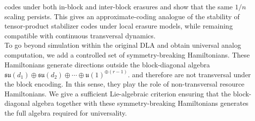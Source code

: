 \documentclass[10pt,twocolumn,superscriptaddress,aps,amsmath,amssymb,citeautoscript,floatfix,prx,longbibliography]{revtex4-2}
\newcounter{alg}
\theoremstyle{plain}
\theoremstyle{plain}
\theoremstyle{plain}
\theoremstyle{plain}
\theoremstyle{plain}
\theoremstyle{plain}
\begin{document}
{codes under both in-block and inter-block erasures and show that the same \(1/n\) scaling persists. This gives an approximate-coding analogue of the stability of tensor-product stabilizer codes under local erasure models, while remaining compatible with continuous transversal dynamics.\\
To go beyond simulation within the original DLA and obtain universal analog computation, we add a controlled set of symmetry-breaking Hamiltonians. These Hamiltonians generate directions outside the block-diagonal algebra
$
    \mathfrak{su}(d_1)\oplus\mathfrak{su}(d_2)\oplus\cdots
    \oplus \mathfrak{u}(1)^{\oplus(r-1)}.
$
and therefore are not transversal under the block encoding. In this sense, they play the role of non-transversal resource Hamiltonians. We give a sufficient Lie-algebraic criterion ensuring that the block-diagonal algebra together with these symmetry-breaking Hamiltonians generates the full algebra required for universality.
}
\end{document}
